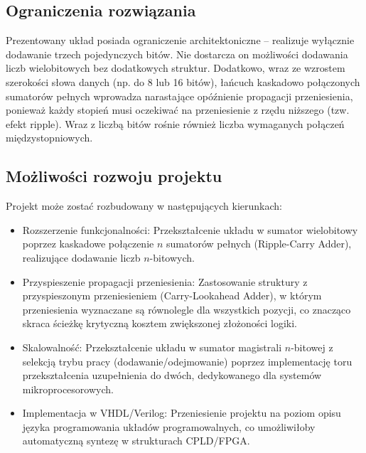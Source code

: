 \subsection{Ograniczenia rozwiązania}

Prezentowany układ posiada ograniczenie architektoniczne -- realizuje wyłącznie dodawanie trzech pojedynczych bitów. Nie dostarcza on możliwości dodawania liczb wielobitowych bez dodatkowych struktur. Dodatkowo, wraz ze wzrostem szerokości słowa danych (np. do 8 lub 16 bitów), łańcuch kaskadowo połączonych sumatorów pełnych wprowadza narastające opóźnienie propagacji przeniesienia, ponieważ każdy stopień musi oczekiwać na przeniesienie z rzędu niższego (tzw. efekt ripple). Wraz z liczbą bitów rośnie również liczba wymaganych połączeń międzystopniowych.

\subsection{Możliwości rozwoju projektu}

Projekt może zostać rozbudowany w następujących kierunkach:

\begin{itemize}
    \item Rozszerzenie funkcjonalności: Przekształcenie układu w sumator wielobitowy poprzez kaskadowe połączenie $n$ sumatorów pełnych (Ripple-Carry Adder), realizujące dodawanie liczb $n$-bitowych.
    \item Przyspieszenie propagacji przeniesienia: Zastosowanie struktury z przyspieszonym przeniesieniem (Carry-Lookahead Adder), w którym przeniesienia wyznaczane są równolegle dla wszystkich pozycji, co znacząco skraca ścieżkę krytyczną kosztem zwiększonej złożoności logiki.
    \item Skalowalność: Przekształcenie układu w sumator magistrali $n$-bitowej z selekcją trybu pracy (dodawanie/odejmowanie) poprzez implementację toru przekształcenia uzupełnienia do dwóch, dedykowanego dla systemów mikroprocesorowych.
    \item Implementacja w VHDL/Verilog: Przeniesienie projektu na poziom opisu języka programowania układów programowalnych, co umożliwiłoby automatyczną syntezę w strukturach CPLD/FPGA.
\end{itemize}
